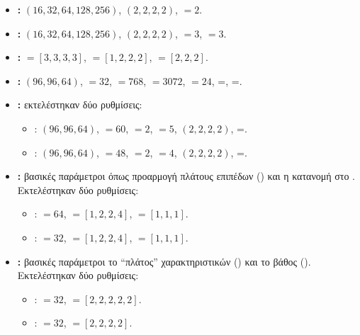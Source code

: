 \begin{itemize}
  \item \textbf{:}
   $(16,32,64,128,256)$,  $(2,2,2,2)$,
   $=2$.

  \item \textbf{:}
   $(16,32,64,128,256)$,  $(2,2,2,2)$,
   $=3$,  $=3$.

  \item \textbf{:}
   $=[3,3,3,3]$,  $=[1,2,2,2]$,
   $=[2,2,2]$.

  \item \textbf{:}
   $(96,96,64)$,  $=32$,
   $=768$,  $=3072$,  $=24$,
  =, =.

  \item \textbf{:}
  εκτελέστηκαν δύο ρυθμίσεις:
  \begin{itemize}
    \item {}:  $(96,96,64)$,
     $=60$,  $=2$,  $=5$,
     $(2,2,2,2)$, =.
    \item {}:  $(96,96,64)$,
     $=48$,  $=2$,  $=4$,
     $(2,2,2,2)$, =.
  \end{itemize}

  \item \textbf{:}
  βασικές παράμετροι όπως προαρμογή πλάτους επιπέδων () και η κατανομή 
  στο . Εκτελέστηκαν δύο ρυθμίσεις:
  \begin{itemize}
    \item {}: $=64$,
    $=[1,2,2,4]$, $=[1,1,1]$.
    \item {}: $=32$,
    $=[1,2,2,4]$, $=[1,1,1]$.
  \end{itemize}

  \item \textbf{:}
  βασικές παράμετροι το ``πλάτος'' χαρακτηριστικών () και το βάθος
  (). Εκτελέστηκαν δύο ρυθμίσεις:
  \begin{itemize}
    \item {}: $=32$, $=[2,2,2,2,2]$.
    \item {}: $=32$, $=[2,2,2,2]$.
  \end{itemize}
\end{itemize}


